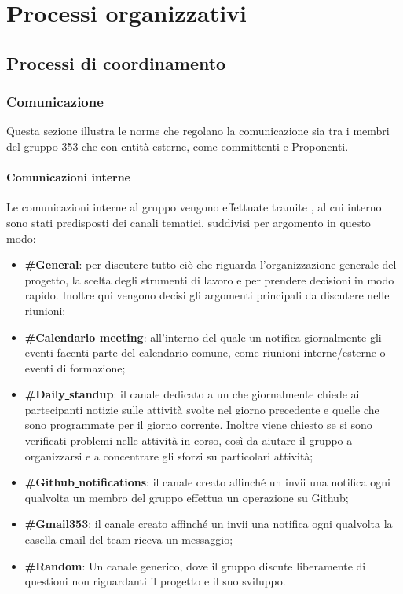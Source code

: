 \documentclass[NormeDiProgetto.tex]{subfiles}
\begin{document}
	\chapter{Processi organizzativi}

	\section{Processi di coordinamento}
	
	\subsection{Comunicazione}
	Questa sezione illustra le norme che regolano la comunicazione sia tra i membri del gruppo 353 che con entità esterne, come committenti e Proponenti.
	\subsubsection{Comunicazioni interne}
	Le comunicazioni interne al gruppo vengono effettuate tramite , al cui interno sono stati predisposti dei canali tematici, suddivisi per argomento in questo modo:

	\begin{itemize}
		\item \textbf{\#General}: per discutere tutto ciò che riguarda l'organizzazione generale del progetto, la scelta degli strumenti di lavoro e per prendere decisioni in modo rapido. Inoltre qui vengono decisi gli argomenti principali da discutere nelle riunioni;
		\item \textbf{\#Calendario\underline{ }meeting}: all'interno del quale un  notifica giornalmente gli eventi facenti parte del calendario comune, come riunioni interne/esterne o eventi di formazione;
		\item \textbf{\#Daily\underline{ }standup}: il canale dedicato a un  che giornalmente chiede ai partecipanti notizie sulle attività svolte nel giorno precedente e quelle che sono programmate per il giorno corrente. Inoltre viene chiesto se si sono verificati problemi nelle attività in corso, così da aiutare il gruppo a organizzarsi e a concentrare gli sforzi su particolari attività;
		\item \textbf{\#Github\underline{ }notifications}: il canale creato affinché un  invii una notifica ogni qualvolta un membro del gruppo effettua un operazione su Github;
		\item \textbf{\#Gmail353}: il canale creato affinché un  invii una notifica ogni qualvolta la casella email del team riceva un messaggio;
		\item \textbf{\#Random}: Un canale generico, dove il gruppo discute liberamente di questioni non riguardanti il progetto e il suo sviluppo.	
	\end{itemize}
\end{document}
